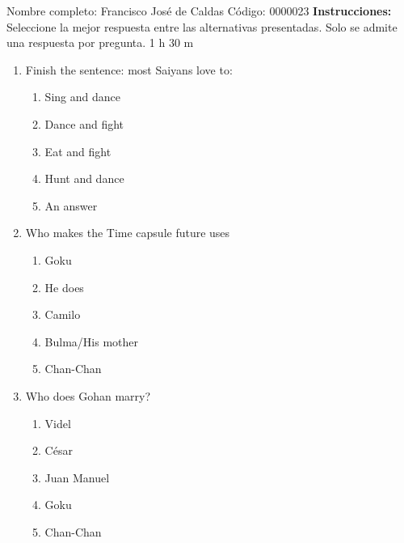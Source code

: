 \documentclass[letterpaper,addpoints,answers,twocolumn,10pt]{exam}
\begin{document}
\noindent Nombre completo: Francisco José de Caldas
\newline \newline \newline \newline
Código: 0000023\newline \newline 
{\bf Instrucciones:} Seleccione la mejor respuesta entre las alternativas presentadas. Solo se admite una respuesta por pregunta.
 1 h 30 m

\begin{enumerate}[leftmargin=.2in]




\item  Finish the sentence: most Saiyans love to:


\begin{enumerate}[noitemsep,leftmargin=0in]


\item  Sing and dance
\item  Dance and fight
\item  Eat and fight
\item  Hunt and dance
\item  An answer


\end{enumerate}



\item  Who makes the Time capsule future uses


\begin{enumerate}[noitemsep,leftmargin=0in]


\item  Goku
\item  He does
\item  Camilo
\item  Bulma/His mother
\item  Chan-Chan


\end{enumerate}



\item  Who does Gohan marry?


\begin{enumerate}[noitemsep,leftmargin=0in]


\item  Videl
\item  César
\item  Juan Manuel
\item  Goku
\item  Chan-Chan



\end{enumerate}
\end{enumerate}
\end{document}
